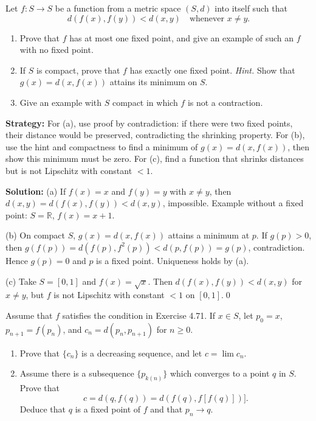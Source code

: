 \begin{problembox}
Let $f: S \to S$ be a function from a metric space $(S, d)$ into itself such that
\[ d(f(x), f(y)) < d(x, y) \quad \text{whenever } x \neq y. \]
\begin{enumerate}[label=(\alph*)]
\item Prove that $f$ has at most one fixed point, and give an example of such an $f$ with no fixed point.
\item If $S$ is compact, prove that $f$ has exactly one fixed point. \textit{Hint.} Show that $g(x) = d(x, f(x))$ attains its minimum on $S$.
\item Give an example with $S$ compact in which $f$ is not a contraction.
\end{enumerate}
\end{problembox}

\noindent\textbf{Strategy:} For (a), use proof by contradiction: if there were two fixed points, their distance would be preserved, contradicting the shrinking property. For (b), use the hint and compactness to find a minimum of $g(x) = d(x, f(x))$, then show this minimum must be zero. For (c), find a function that shrinks distances but is not Lipschitz with constant $< 1$.

\bigskip\noindent\textbf{Solution:}
(a) If $f(x)=x$ and $f(y)=y$ with $x\ne y$, then $d(x,y)=d(f(x),f(y))<d(x,y)$, impossible. Example without a fixed point: $S=\mathbb{R}$, $f(x)=x+1$.

(b) On compact $S$, $g(x)=d(x,f(x))$ attains a minimum at $p$. If $g(p)>0$, then $g(f(p))=d(f(p),f^2(p))<d(p,f(p))=g(p)$, contradiction. Hence $g(p)=0$ and $p$ is a fixed point. Uniqueness holds by (a).

(c) Take $S=[0,1]$ and $f(x)=\sqrt{x}$. Then $d(f(x),f(y))<d(x,y)$ for $x\ne y$, but $f$ is not Lipschitz with constant $<1$ on $[0,1]$.\qed



\begin{problembox}
Assume that $f$ satisfies the condition in Exercise 4.71. If $x \in S$, let $p_0 = x$, $p_{n+1} = f(p_n)$, and $c_n = d(p_n, p_{n+1})$ for $n \geq 0$.
\begin{enumerate}[label=(\alph*)]
\item Prove that $\{c_n\}$ is a decreasing sequence, and let $c = \lim c_n$.
\item Assume there is a subsequence $\{p_{k(n)}\}$ which converges to a point $q$ in $S$. Prove that
\[c = d(q, f(q)) = d(f(q), f[f(q)])].\]
Deduce that $q$ is a fixed point of $f$ and that $p_n \to q$.
\end{enumerate}
\end{problembox}

